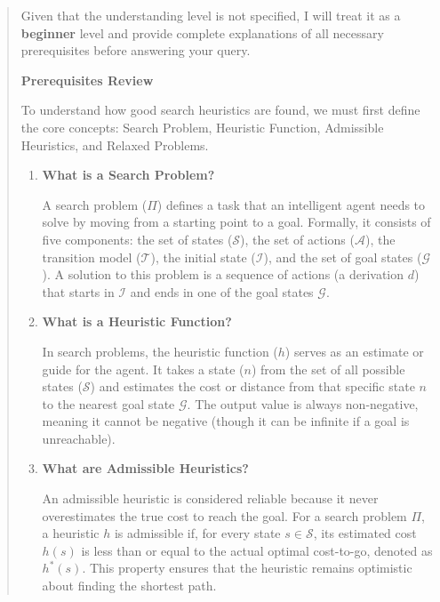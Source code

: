 \begin{quote}
    \label{appendix:raft_model_answer}

    Given that the understanding level is not specified, I will treat it as a \textbf{beginner} level and provide complete explanations of all necessary prerequisites before answering your query.

    \medskip

    \noindent\textbf{Prerequisites Review}

    To understand how good search heuristics are found, we must first define the core concepts: Search Problem, Heuristic Function, Admissible Heuristics, and Relaxed Problems.

    \begin{enumerate}

        \item \textbf{What is a Search Problem?}

              A search problem ($\Pi$) defines a task that an intelligent agent needs to solve by moving from a starting point to a goal. Formally, it consists of five components: the set of states ($\mathcal{S}$), the set of actions ($\mathcal{A}$), the transition model ($\mathcal{T}$), the initial state ($\mathcal{I}$), and the set of goal states ($\mathcal{G}$). A solution to this problem is a sequence of actions (a derivation $d$) that starts in $\mathcal{I}$ and ends in one of the goal states $\mathcal{G}$.

        \item \textbf{What is a Heuristic Function?}

              In search problems, the heuristic function ($h$) serves as an estimate or guide for the agent. It takes a state ($n$) from the set of all possible states ($\mathcal{S}$) and estimates the cost or distance from that specific state $n$ to the nearest goal state $\mathcal{G}$. The output value is always non-negative, meaning it cannot be negative (though it can be infinite if a goal is unreachable).

        \item \textbf{What are Admissible Heuristics?}

              An admissible heuristic is considered reliable because it never overestimates the true cost to reach the goal. For a search problem $\Pi$, a heuristic $h$ is admissible if, for every state $s \in \mathcal{S}$, its estimated cost $h(s)$ is less than or equal to the actual optimal cost-to-go, denoted as $h^*(s)$. This property ensures that the heuristic remains optimistic about finding the shortest path.


\end{enumerate}
\end{quote}
